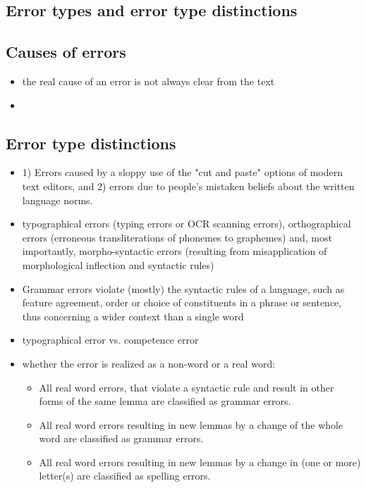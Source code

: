 \documentclass[a4paper,english,12pt]{article}
\begin{document}
\begin{spacing}{1.0}
\section{Error types and error type distinctions}

\subsection{Causes of errors}

\begin{itemize}
\item the real cause of an error is not always clear from the text \citet[p.27]{Sofkova2003}
\item 
\end{itemize}

\subsection{Error type distinctions}

\begin{itemize}
\item 1) Errors caused by a sloppy use of the "cut and paste" options of modern text editors, and 2) errors due to people's mistaken beliefs about the written language norms. \citet{Hagen2001a}
\item typographical errors (typing errors or OCR scanning errors), orthographical errors (erroneous transliterations of phonemes to graphemes) and, most importantly, morpho-syntactic errors (resulting from misapplication of morphological inflection and syntactic rules) \citet{Vosse1992}
\item Grammar errors violate (mostly) the syntactic rules of a language, such as feature agreement, order or choice of constituents in a phrase or sentence, thus concerning a wider context than a single word \citet[p.27]{Sofkova2003}
\item typographical error vs. competence error
\item whether the error is realized as a non-word or a real word:
	\begin{itemize}
	\item All real word errors, that violate a syntactic rule and result in other
	forms of the same lemma are classified as grammar errors.
	\item All real word errors resulting in new lemmas by a change of the
	whole word are classified as grammar errors.
	\item All real word errors resulting in new lemmas by a change in (one
	or more) letter(s) are classified as spelling errors. \citet[p.30]{Sofkova2003}
	\end{itemize}
\end{itemize}


\end{spacing}
\end{document}

